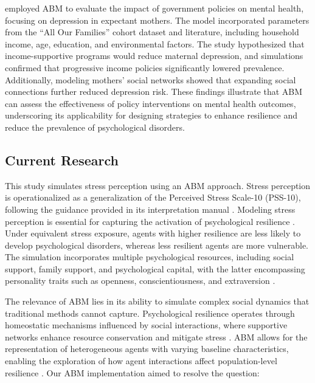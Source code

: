 \documentclass[
  letterpaper,
  DIV=11,
  numbers=noendperiod]{scrartcl}
\begin{document}
\citet{Benny2022} employed ABM to evaluate the impact of government
policies on mental health, focusing on depression in expectant mothers.
The model incorporated parameters from the ``All Our Families'' cohort
dataset and literature, including household income, age, education, and
environmental factors. The study hypothesized that income-supportive
programs would reduce maternal depression, and simulations confirmed
that progressive income policies significantly lowered prevalence.
Additionally, modeling mothers' social networks showed that expanding
social connections further reduced depression risk. These findings
illustrate that ABM can assess the effectiveness of policy interventions
on mental health outcomes, underscoring its applicability for designing
strategies to enhance resilience and reduce the prevalence of
psychological disorders.

\subsection{Current Research}\label{current-research}

This study simulates stress perception using an ABM approach. Stress
perception is operationalized as a generalization of the Perceived
Stress Scale-10 (PSS-10), following the guidance provided in its
interpretation manual \citep{cohen1988perceived}. Modeling stress
perception is essential for capturing the activation of psychological
resilience \citep{parsons2016cognitive}. Under equivalent stress
exposure, agents with higher resilience are less likely to develop
psychological disorders, whereas less resilient agents are more
vulnerable. The simulation incorporates multiple psychological
resources, including social support, family support, and psychological
capital, with the latter encompassing personality traits such as
openness, conscientiousness, and extraversion
\citep{Hobfoll1989, klaver2021exposure, ZagerKocjan2021}.

The relevance of ABM lies in its ability to simulate complex social
dynamics that traditional methods cannot capture. Psychological
resilience operates through homeostatic mechanisms influenced by social
interactions, where supportive networks enhance resource conservation
and mitigate stress \citep{Hobfoll2002, FasihiHarandi2017}. ABM allows
for the representation of heterogeneous agents with varying baseline
characteristics, enabling the exploration of how agent interactions
affect population-level resilience \citep{Andarlia2021, Lopez2024}. Our
ABM implementation aimed to resolve the question:
\end{document}

